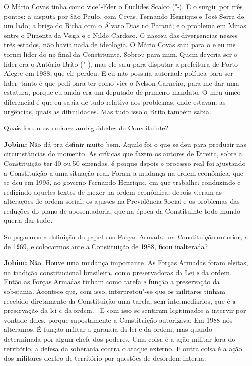 O Mário Covas tinha como vice"-líder o Euclides Scalco ("-). E o
 surgiu por três pontos: a disputa por São Paulo, com Covas,
Fernando Henrique e José Serra de um lado; a briga do Richa com o Álvaro
Dias no Paraná; e o problema em Minas entre o Pimenta da Veiga e o Nildo
Cardoso. O  nasceu das divergencias nesses três estados, não havia
nada de ideologia. O Mário Covas saiu para o  e eu me tornei líder
do  no final da Constituinte. Sobrou para mim. Quem deveria ser o
líder era o Antônio Brito ("-), mas ele saiu para disputar a
prefeitura de Porto Alegre em 1988, que ele perdeu. E eu não possuía
autoriade política para ser líder, tanto é que pedi para ter como vice o
Nelson Carneiro, para me dar uma estatura, porque eu ainda era um
deputado de primeiro mandato. O meu único diferencial é que eu sabia de
tudo relativo aos problemas, onde estavam as urgências, quais as
dificuldades. Mas tudo isso o Brito também sabia.

Quais foram as maiores ambiguidades da Constituinte?

\textbf{Jobim:} Não dá pra definir muito bem. Aquilo foi o que se deu
para produzir nas circunstâncias do momento. As críticas que fazem os
autores de Direito, sobre a Constituição ter 40 ou 50 emendas, é porque
depois o processo real foi ajustando a Constituição a uma situação real.
Foram a mudança na ordem econômica, que se deu em 1995, no governo
Fernando Henrique, em que trabalhei conduzindo e redigindo aqueles
textos de mexer na ordem econômica; depois vieram as alterações de ordem
social, os ajustes na Previdência Social e os problemas das reduções do
plano de aposentadoria, que na época da Constituinte todo mundo queria
dar tudo.

Se pegarmos a definição do papel das Forças Armadas na Constituição
anterior, a de 1969, e colocarmos ante a Constituição de 1988, ficou
inalterada?

\textbf{Jobim:} Não. Houve uma mudança importante. As Forças Armadas
foram eleitas, na tradição constitucional brasileira, como preservadoras
da Lei e da ordem. Então as Forças Armadas tinham como tarefa e função a
preservação da soberania. Acontece que, com isso, interpretou"-se que os
militares tinham recebido diretamente da Constituição uma tarefa, sem
intermediários, que é a preservação da lei e da ordem.~ E com isso se
sentiram legitimados a intervir por vontade deles, porque supostamente a
Constituição autorizava. Em 1988 nós alteramos. É função militar a
garantia da lei e da ordem, mas quando determinada por algum chefe dos
poderes. Uma coisa é a ação militar fora do território, a defesa da
soberania contra o ataque externo. E outra coisa é a ação dos militares
dentro do território por questões de desordem interna.

